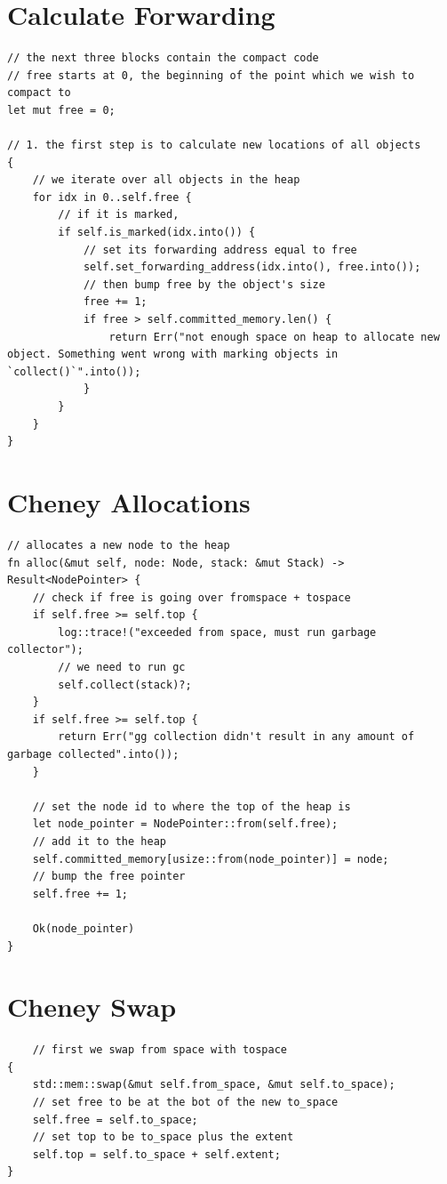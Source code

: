 \documentclass[index]{subfiles}
\begin{document}
\section{Calculate Forwarding}
\begin{verbatim}
// the next three blocks contain the compact code
// free starts at 0, the beginning of the point which we wish to compact to
let mut free = 0;

// 1. the first step is to calculate new locations of all objects
{
    // we iterate over all objects in the heap
    for idx in 0..self.free {
        // if it is marked,
        if self.is_marked(idx.into()) {
            // set its forwarding address equal to free
            self.set_forwarding_address(idx.into(), free.into());
            // then bump free by the object's size
            free += 1;
            if free > self.committed_memory.len() {
                return Err("not enough space on heap to allocate new object. Something went wrong with marking objects in `collect()`".into());
            }
        }
    }
}
\end{verbatim}
\section{Cheney Allocations}
\begin{verbatim}
// allocates a new node to the heap
fn alloc(&mut self, node: Node, stack: &mut Stack) -> Result<NodePointer> {
    // check if free is going over fromspace + tospace
    if self.free >= self.top {
        log::trace!("exceeded from space, must run garbage collector");
        // we need to run gc
        self.collect(stack)?;
    }
    if self.free >= self.top {
        return Err("gg collection didn't result in any amount of garbage collected".into());
    }

    // set the node id to where the top of the heap is
    let node_pointer = NodePointer::from(self.free);
    // add it to the heap
    self.committed_memory[usize::from(node_pointer)] = node;
    // bump the free pointer
    self.free += 1;

    Ok(node_pointer)
}
\end{verbatim}
\section{Cheney Swap}
\begin{verbatim}
    // first we swap from space with tospace
{
    std::mem::swap(&mut self.from_space, &mut self.to_space);
    // set free to be at the bot of the new to_space
    self.free = self.to_space;
    // set top to be to_space plus the extent
    self.top = self.to_space + self.extent;
}
\end{verbatim}
\end{document}
